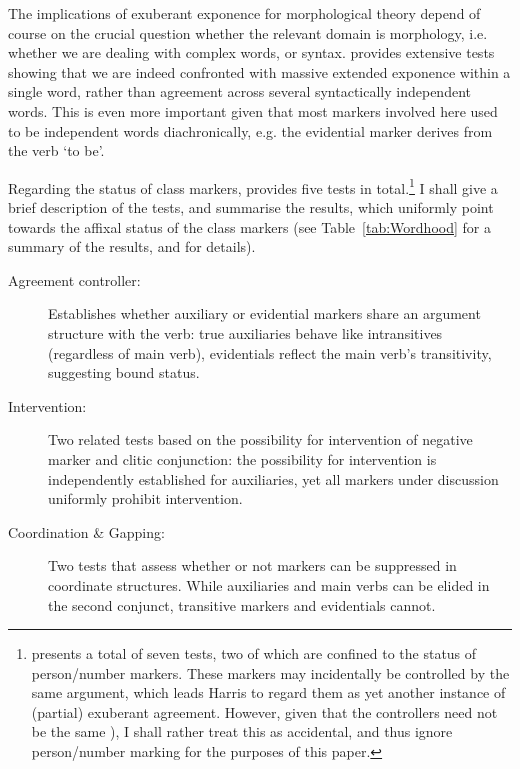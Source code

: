 \documentclass[output=paper]{langsci/langscibook}
\begin{document}
The implications of exuberant exponence for morphological theory
depend of course on the crucial question whether the relevant domain
is morphology, i.e. whether we are dealing with complex words, or
syntax. \citet{Harris09} provides extensive tests showing that we are
indeed confronted with massive extended exponence within a single
word, rather than agreement across several syntactically independent
words. This is even more important given that most markers involved
here used to be independent words diachronically, e.g. the evidential
marker derives from the verb `to be'. %

Regarding the status of class markers, \citet{Harris09} provides five
tests in total.\footnote{\citet{Harris09} presents a
  total of seven tests, two of which are confined to the status of
  person/number markers. These markers may incidentally be controlled
  by the same argument, which leads Harris to regard them as yet
  another instance of (partial) exuberant agreement. However, given
  that the controllers need not be the same
  \citep[see][ex. 33]{Harris09}), I shall rather treat this as
  accidental, and thus ignore person/number marking for the
  purposes of this paper.} I shall give a brief description of the
tests, and summarise the results, which uniformly point towards the
affixal status of the class markers (see Table~\ref{tab:Wordhood} for
a summary of the results, and
\citealt[sec.~5]{Harris09} for details).

\begin{description}
\item[Agreement controller:] Establishes whether
  auxiliary or evidential markers share an argument structure with the
  verb: true auxiliaries behave like intransitives (regardless of main
  verb), evidentials reflect the main verb's transitivity, suggesting
  bound status.
\item[Intervention:] Two related tests based on the possibility for
  intervention of negative marker and clitic conjunction:
  the possibility for intervention is independently established for
  auxiliaries, yet all markers under discussion uniformly prohibit
  intervention. 
\item[Coordination \& Gapping:] {\sloppy Two tests that assess
  whether or not markers can be suppressed in coordinate structures. While
  auxiliaries and main verbs can be elided in the second conjunct,
  transitive markers and evidentials cannot. }
\end{description}
\end{document}
